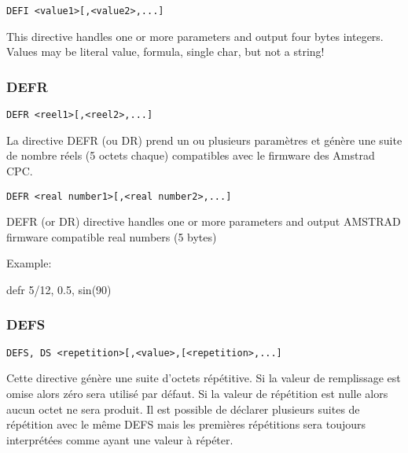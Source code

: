 \begin{xen}
\begin{verbatim}
DEFI <value1>[,<value2>,...]
\end{verbatim}

This directive handles one or more parameters and output four bytes integers.
Values may be literal value, formula, single char, but not a string!
\end{xen}

\subsubsection{DEFR}

\begin{xfr}
\begin{verbatim}
DEFR <reel1>[,<reel2>,...]
\end{verbatim}

La directive DEFR (ou DR) prend un ou plusieurs paramètres et génère une suite de nombre réels (5 octets chaque) compatibles avec le firmware des Amstrad CPC.
\end{xfr}


\begin{xen}
\begin{verbatim}
DEFR <real number1>[,<real number2>,...]
\end{verbatim}

DEFR (or DR) directive handles one or more parameters and output AMSTRAD firmware compatible real numbers (5 bytes)
\end{xen}

Example:
\begin{code}
defr 5/12, 0.5, sin(90)
\end{code}

\subsubsection{DEFS}

\begin{verbatim}
DEFS, DS <repetition>[,<value>,[<repetition>,...]
\end{verbatim}

\begin{xfr}
Cette directive génère une suite d'octets répétitive. Si la valeur de remplissage est omise alors zéro sera utilisé par défaut. Si la valeur de répétition est nulle alors aucun octet ne sera produit. Il est possible de déclarer plusieurs suites de répétition avec le même DEFS mais les premières répétitions sera toujours interprétées comme ayant une valeur à répéter.
\end{xfr}

